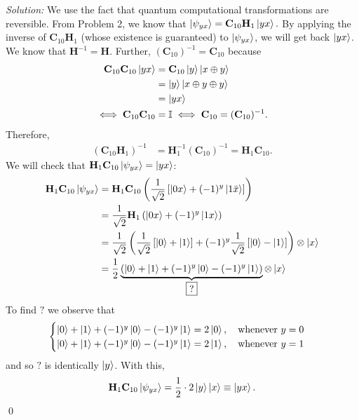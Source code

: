 \documentclass{book}
\theoremstyle{definition}
\newcommand{\nn}{\nonumber}
\newcommand{\f}[2]{\frac{#1}{#2}}
\newcommand{\lp}{\left(}
\newcommand{\rp}{\right)}
\newcommand{\lb}{\left[}
\newcommand{\rb}{\right]}
\newcommand{\Id}{\mathbb{I}}
\newcommand{\had}{\mathbf{H}}
\begin{document}
\noindent \textit{Solution:} We use the fact that quantum computational transformations are reversible. From Problem 2, we know that $\ket{\psi_{yx}} = \mathbf{C}_{10}\had_1 \ket{yx}.$  By applying the inverse of $\mathbf{C}_{10}\had_1$ (whose existence is guaranteed) to $\ket{\psi_{yx}}$, we will get back $\ket{yx}$. We know that $\had^{-1} = \had$. Further, $(\mathbf{C}_{10})^{-1} = \mathbf{C}_{10}$ because
\begin{align}
\mathbf{C}_{10}\mathbf{C}_{10} \ket{yx} &= \mathbf{C}_{10}\ket{y}\ket{x\oplus y}\nn\\ 
&= \ket{y}\ket{x\oplus y \oplus y} \nn\\
&=\ket{yx} \nn\\
\iff \mathbf{C}_{10}\mathbf{C}_{10} &= \Id \iff \mathbf{C}_{10} = (\mathbf{C}_{10})^{-1}.
\end{align}
Therefore, 
\begin{align}
(\mathbf{C}_{10}\had_1)^{-1} &= \had_1^{-1}(\mathbf{C}_{10})^{-1} = \had_1 \mathbf{C}_{10}.
\end{align}
We will check that $\had_1 \mathbf{C}_{10}\ket{\psi_{yx}} = \ket{yx}$:
\begin{align}
\had_1 \mathbf{C}_{10}\ket{\psi_{yx}} &= \had_1 \mathbf{C}_{10}\lp \f{1}{\sqrt{2}}\lb \ket{0x} + (-1)^{y}\ket{1\bar{x}} \rb \rp\nn\\
&= \f{1}{\sqrt{2}} \had_1 \lp \ket{0x} + (-1)^y \ket{1x}  \rp\nn\\
&= \f{1}{\sqrt{2}} \lp \f{1}{\sqrt{2}}\lb \ket{0} + \ket{1}  \rb  + (-1)^y \f{1}{\sqrt{2}} \lb \ket{0} - \ket{1} \rb \rp \otimes \ket{x}\nn\\
&= \f{1}{2}\underbrace{\lp \ket{0} + \ket{1} + (-1)^{y}\ket{0} - (-1)^y\ket{1}  \rp}_{\boxed{?}} \otimes \ket{x}
\end{align}
To find $\boxed{?}$ we observe that
\begin{align}
\begin{cases}
\ket{0} + \ket{1} + (-1)^{y}\ket{0} - (-1)^y\ket{1} = 2\ket{0}, \quad \text{whenever } y = 0\\
\ket{0} + \ket{1} + (-1)^{y}\ket{0} - (-1)^y\ket{1} = 2\ket{1}, \quad \text{whenever }  y = 1
\end{cases}
\end{align}
and so $\boxed{?}$ is identically $\ket{y}$. With this, 
\begin{align}
\had_1 \mathbf{C}_{10}\ket{\psi_{yx}} = \f{1}{2}\cdot 2\ket{y}\ket{x} \equiv \ket{yx}.
\end{align}\qed
\end{document}
